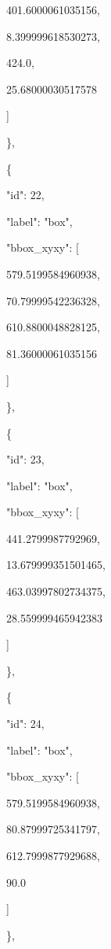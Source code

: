 \documentclass[10pt,a4paper]{article}
\begin{document}
        401.6000061035156,\allowbreak{}\par
        8.399999618530273,\allowbreak{}\par
        424.0,\allowbreak{}\par
        25.68000030517578\par
      ]\par
    \},\allowbreak{}\par
    \{\par
      "id":\allowbreak{} 22,\allowbreak{}\par
      "label":\allowbreak{} "box",\allowbreak{}\par
      "bbox\_xyxy":\allowbreak{} [\par
        579.5199584960938,\allowbreak{}\par
        70.79999542236328,\allowbreak{}\par
        610.8800048828125,\allowbreak{}\par
        81.36000061035156\par
      ]\par
    \},\allowbreak{}\par
    \{\par
      "id":\allowbreak{} 23,\allowbreak{}\par
      "label":\allowbreak{} "box",\allowbreak{}\par
      "bbox\_xyxy":\allowbreak{} [\par
        441.2799987792969,\allowbreak{}\par
        13.679999351501465,\allowbreak{}\par
        463.03997802734375,\allowbreak{}\par
        28.559999465942383\par
      ]\par
    \},\allowbreak{}\par
    \{\par
      "id":\allowbreak{} 24,\allowbreak{}\par
      "label":\allowbreak{} "box",\allowbreak{}\par
      "bbox\_xyxy":\allowbreak{} [\par
        579.5199584960938,\allowbreak{}\par
        80.87999725341797,\allowbreak{}\par
        612.7999877929688,\allowbreak{}\par
        90.0\par
      ]\par
    \},\allowbreak{}\par
\end{document}
